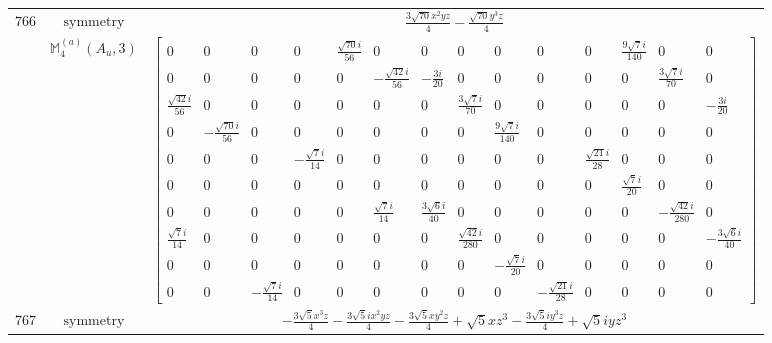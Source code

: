\documentclass[fleqn,8pt,landscape]{jsarticle}
\begin{document}
\begin{longtable}{ccc}
$ 766 $ & $ \text{symmetry} $ & $ \frac{3 \sqrt{70} x^{2} y z}{4} - \frac{\sqrt{70} y^{3} z}{4} $ \\
$  $ & $ \mathbb{M}_{4}^{(a)}(A_{u},3) $ & $ \begin{bmatrix} 0 & 0 & 0 & 0 & \frac{\sqrt{70} i}{56} & 0 & 0 & 0 & 0 & 0 & 0 & \frac{9 \sqrt{7} i}{140} & 0 & 0 \\ 0 & 0 & 0 & 0 & 0 & - \frac{\sqrt{42} i}{56} & - \frac{3 i}{20} & 0 & 0 & 0 & 0 & 0 & \frac{3 \sqrt{7} i}{70} & 0 \\ \frac{\sqrt{42} i}{56} & 0 & 0 & 0 & 0 & 0 & 0 & \frac{3 \sqrt{7} i}{70} & 0 & 0 & 0 & 0 & 0 & - \frac{3 i}{20} \\ 0 & - \frac{\sqrt{70} i}{56} & 0 & 0 & 0 & 0 & 0 & 0 & \frac{9 \sqrt{7} i}{140} & 0 & 0 & 0 & 0 & 0 \\ 0 & 0 & 0 & - \frac{\sqrt{7} i}{14} & 0 & 0 & 0 & 0 & 0 & 0 & \frac{\sqrt{21} i}{28} & 0 & 0 & 0 \\ 0 & 0 & 0 & 0 & 0 & 0 & 0 & 0 & 0 & 0 & 0 & \frac{\sqrt{7} i}{20} & 0 & 0 \\ 0 & 0 & 0 & 0 & 0 & \frac{\sqrt{7} i}{14} & \frac{3 \sqrt{6} i}{40} & 0 & 0 & 0 & 0 & 0 & - \frac{\sqrt{42} i}{280} & 0 \\ \frac{\sqrt{7} i}{14} & 0 & 0 & 0 & 0 & 0 & 0 & \frac{\sqrt{42} i}{280} & 0 & 0 & 0 & 0 & 0 & - \frac{3 \sqrt{6} i}{40} \\ 0 & 0 & 0 & 0 & 0 & 0 & 0 & 0 & - \frac{\sqrt{7} i}{20} & 0 & 0 & 0 & 0 & 0 \\ 0 & 0 & - \frac{\sqrt{7} i}{14} & 0 & 0 & 0 & 0 & 0 & 0 & - \frac{\sqrt{21} i}{28} & 0 & 0 & 0 & 0 \end{bmatrix} $ \\ \hline
$ 767 $ & $ \text{symmetry} $ & $ - \frac{3 \sqrt{5} x^{3} z}{4} - \frac{3 \sqrt{5} i x^{2} y z}{4} - \frac{3 \sqrt{5} x y^{2} z}{4} + \sqrt{5} x z^{3} - \frac{3 \sqrt{5} i y^{3} z}{4} + \sqrt{5} i y z^{3} $ \\

\end{longtable}
\end{document}

